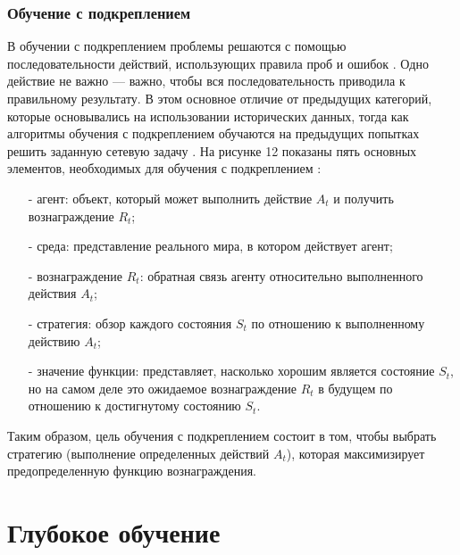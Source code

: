 \subsubsection{Обучение с подкреплением}

В обучении с подкреплением проблемы решаются с помощью последовательности действий, использующих правила проб и ошибок . Одно действие не важно — важно, чтобы вся последовательность приводила к правильному результату. В этом основное отличие от предыдущих категорий, которые основывались на использовании исторических данных, тогда как алгоритмы обучения с подкреплением обучаются на предыдущих попытках решить заданную сетевую задачу \cite{surverymashin}. На рисунке 12 показаны пять основных элементов, необходимых для обучения с подкреплением \cite{transactonne}:


\FloatBarrier

\begin{itemize}
	\item[-]  агент: объект, который может выполнить действие $A_{t}$ и получить вознаграждение $R_{t}$;
	\item[-] среда: представление реального мира, в котором действует агент;
	\item[-] вознаграждение $R_{t}$: обратная связь агенту относительно выполненного действия $A_{t}$;
	\item[-] стратегия: обзор каждого состояния $S_{t}$ по отношению к выполненному действию $A_{t}$;
	\item[-] значение функции: представляет, насколько хорошим является состояние $S_{t}$, но на самом деле это ожидаемое вознаграждение $R_{t}$ в будущем по отношению к достигнутому состоянию $S_{t}$.
\end{itemize}

Таким образом, цель обучения с подкреплением состоит в том, чтобы выбрать стратегию (выполнение определенных действий $A_{t}$), которая максимизирует предопределенную функцию вознаграждения.

\section{Глубокое обучение}

